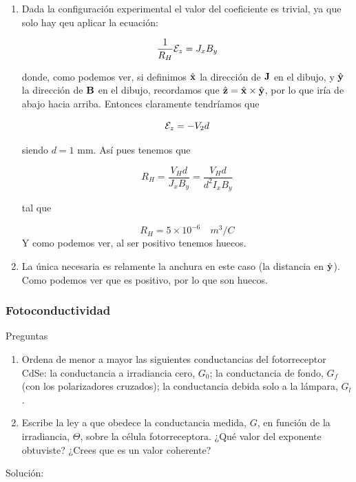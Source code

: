 \begin{enumerate}[label=\alph*)]
	\item Dada la configuración experimental el valor del coeficiente es trivial, ya que solo hay qeu aplicar la ecuación:

	\[
	\frac{1}{R_H} \mathcal{E}_z = J_x B_y
	\]

	donde, como podemos ver, si definimos $\hat{\mathbf{x}}$ la dirección de $\mathbf{J}$ en el dibujo, y  $\hat{\mathbf{y}}$ la dirección de $\mathbf{B}$ en el dibujo, recordamos que $\hat{\mathbf{z}}=\hat{\mathbf{x}}\times \hat{\mathbf{y}}$, por lo que iría de abajo hacia arriba. Entonces claramente tendríamos que 

	\[
		\mathcal{E}_z = - V_2 d 
	\]

	siendo $d=1$ mm. Así pues tenemos que 

	\[
		R_H = \frac{V_H d}{J_x B_y} = \frac{V_H d}{d^2 I_x B_y}
	\]	
	
	tal que

	\[
		R_H = 5 \times 10^{-6} \quad \unit{m^{3}/C}
	\]
	Y como podemos ver, al ser positivo tenemos huecos. 
	
	\item La única necesaria es relamente la anchura en este caso (la distancia en $\hat{\mathbf{y}}$). Como podemos ver que es positivo, por lo que son huecos. 
	
	\end{enumerate}

\vspace*{2em}

\begin{Enunciado}
	\subsubsection{Fotoconductividad}
	Preguntas
	\begin{enumerate}[label=\alph*)]
	\item Ordena de menor a mayor las siguientes conductancias del fotorreceptor CdSe: la conductancia a irradiancia cero, \( G_0 \); la conductancia de fondo, \( G_f \) (con los polarizadores cruzados); la conductancia debida solo a la lámpara, \( G_l \).
	\item Escribe la ley a que obedece la conductancia medida, \( G \), en función de la irradiancia, \( \Theta \), sobre la célula fotorreceptora. ¿Qué valor del exponente obtuviste? ¿Crees que es un valor coherente?
	\end{enumerate}
\end{Enunciado}

Solución:

